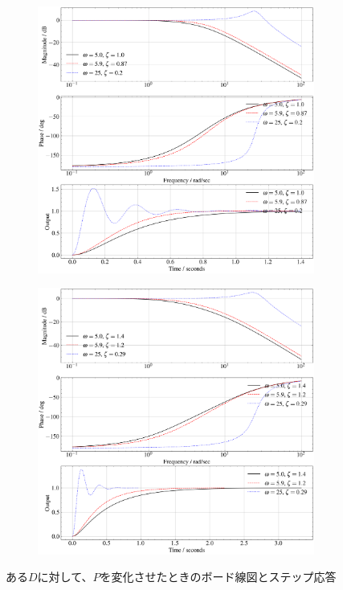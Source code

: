 \begin{figure}
    \centering
    \begin{subfigure}{0.8\linewidth}
        \centering
        \includegraphics[width=0.8\linewidth]{src/figures/bode-phase-step-ideal-group-real/bode-phase-step-ideal-group-real-1.png}
        \label{fig:bode-phase-step-ideal-group-real-d-0}
    \end{subfigure}
    \begin{subfigure}{0.8\linewidth}
        \centering
        \includegraphics[width=0.8\linewidth]{src/figures/bode-phase-step-ideal-group-real/bode-phase-step-ideal-group-real-2.png}
        \label{fig:bode-phase-step-ideal-group-real-d-60}
    \end{subfigure}
    \caption{ある$D$に対して、$P$を変化させたときのボード線図とステップ応答}\label{fig:bode-phase-step-ideal-group-real}
\end{figure}


